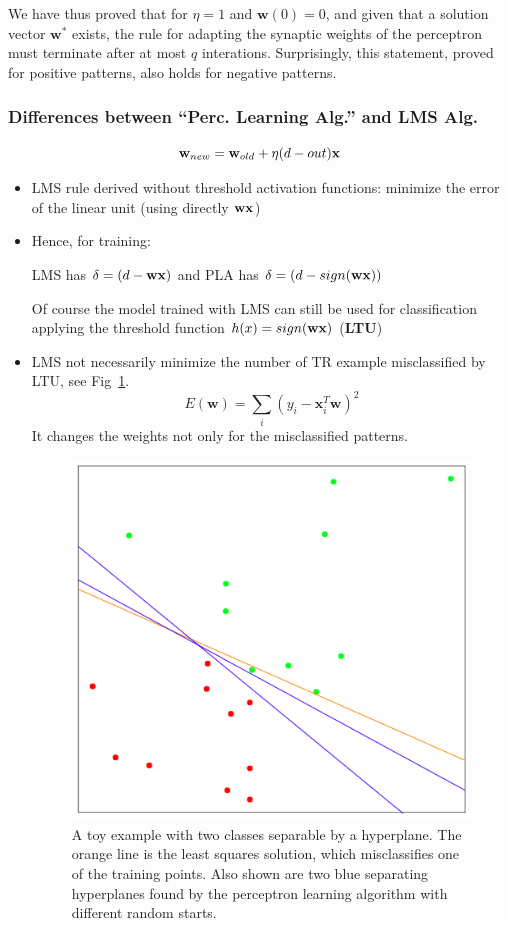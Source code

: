\documentclass[../main.tex]{subfiles}
\begin{document}
We have thus proved that for $\eta = 1$ and $\mathbf{w}(0) = 0$, and given that a solution vector $\mathbf{w^*}$ exists, the rule for adapting the synaptic weights of the perceptron must terminate after at most $q$ interations. Surprisingly, this statement, proved for positive patterns, also holds for negative patterns.


\subsubsection{Differences between “Perc. Learning Alg.” and LMS Alg.}
$$\bold{w}_{new} = \bold{w}_{old} + \eta (d-out)\bold{x}$$
\begin{itemize}
    \item LMS rule derived without threshold activation functions: minimize the error of the linear unit (using directly $\bold{wx}$)
    \item Hence, for training:
    \begin{center}
        LMS has $\delta=(d-\bold{wx})$ and PLA has $\delta=(d-sign(\bold{wx}))$
    \end{center}
    Of course the model trained with LMS can still be used for classification applying the threshold function $h(x)= sign(\bold{wx})$ (\textbf{LTU})
    
    \item LMS not necessarily minimize the number of TR example misclassified by LTU, see Fig~\ref{fig:misclassify}.
    $$ E(\mathbf{w}) = \sum_{i}^{} (y_i - \mathbf{x}^{T}_{i}\mathbf{w})^2$$
    It changes the weights not only for the misclassified patterns.
    \begin{figure}[h]
        \centering
        \includegraphics[scale = 0.3]{lectures/4_neural_networks/4_LMS_PLA.png}
        \caption{A toy example with two classes separable by a hyperplane. The orange line is the least squares solution, which misclassifies one of the training points. Also shown are two blue separating hyperplanes found by the perceptron learning algorithm with different random starts.}
        \label{fig:misclassify}
    \end{figure}
    

\end{itemize}
\end{document}
